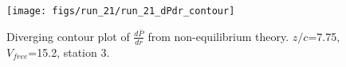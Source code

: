 \begin{figure}[H]
\centering
\texttt{[image: figs/run\_21/run\_21\_dPdr\_contour]}
\caption{Diverging contour plot of $\frac{d\bar{P}}{dr}$ from non-equilibrium theory. $z/c$=7.75, $V_{free}$=15.2, station 3.}
\label{fig:run_21_dPdr_contour}
\end{figure}


